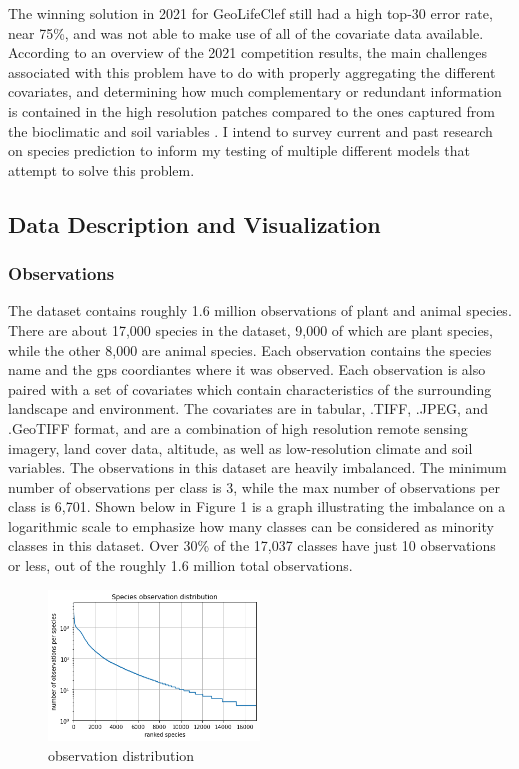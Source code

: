 \documentclass[12pt, oneside]{article}
\begin{document}
\begin{normalsize}
The winning solution in 2021 for GeoLifeClef still had a high top-30 error rate, near 75\%, and was not able to make use of all of the covariate data available. According to an overview of the 2021 competition results, the main challenges associated with this problem have to do with properly aggregating the different covariates, and determining how much complementary or redundant information is contained in the high resolution patches compared to the ones captured from the bioclimatic and soil variables \cite{lorieul2021overview}. I intend to survey current and past research on species prediction to inform my testing of multiple different models that attempt to solve this problem. 

\subsection{Data Description and Visualization}

\subsubsection{Observations}

The dataset contains roughly 1.6 million observations of plant and animal species. There are about 17,000 species in the dataset, 9,000 of which are plant species, while the other 8,000 are animal species. Each observation contains the species name and the gps coordiantes where it was observed. Each observation is also paired with a set of covariates which contain characteristics of the surrounding landscape and environment. The covariates are in tabular, .TIFF, .JPEG, and .GeoTIFF format, and are a combination of high resolution remote sensing imagery, land cover data, altitude, as well as low-resolution climate and soil variables. The observations in this dataset are heavily imbalanced. The minimum number of observations per class is 3, while the max number of observations per class is 6,701. Shown below in Figure 1 is a graph illustrating the imbalance on a logarithmic scale to emphasize how many classes can be considered as minority classes in this dataset. Over 30\% of the 17,037 classes have just 10 observations or less, out of the roughly 1.6 million total observations.

\begin{figure}[H]
\caption{observation distribution}
\centering
\includegraphics[width=0.5\textwidth]{observations}
\end{figure}


\end{normalsize}
\end{document}
